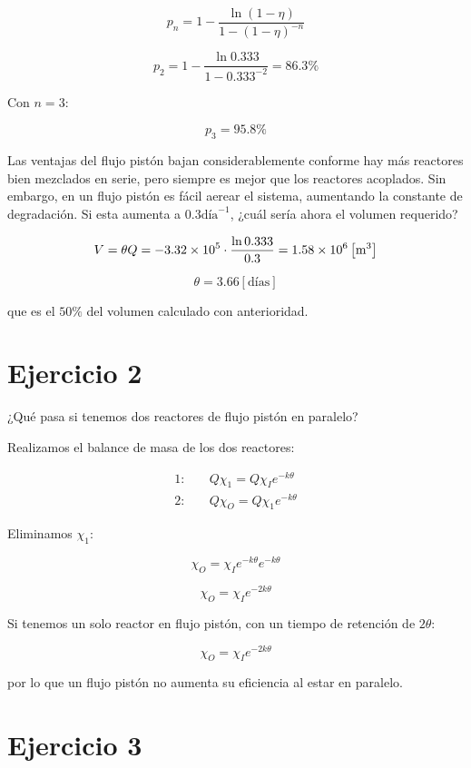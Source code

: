 \documentclass[11pt]{article}
\begin{document}
\[ \boxed{ p_n = 1 - \frac{ \ln \left( 1 - \eta \right) }{ 1 - \left( 1 - \eta \right)^{-n} } } \]

\[ p_2 = 1 - \frac{ \ln 0.333 }{ 1 - 0.333^{-2} } = 86.3 \% \]

Con \( n = 3 \):

\[ p_3 = 95.8 \% \]

Las ventajas del flujo pistón bajan considerablemente conforme hay más reactores bien mezclados en serie, pero siempre es mejor que los reactores acoplados. Sin embargo, en un flujo pistón es fácil aerear el sistema, aumentando la constante de degradación. Si esta aumenta a \( 0.3 \text{día}^{-1} \), ¿cuál sería ahora el volumen requerido?

\[ V = \theta Q = -3.32 \times 10^5 \cdot \frac{ \ln 0.333 }{ 0.3 } = 1.58 \times 10^6 \left[ \text m ^ 3 \right] \]

\[ \theta = 3.66 \left[ \text{días} \right] \]

que es el \( 50 \% \) del volumen calculado con anterioridad.

\section{Ejercicio 2}

¿Qué pasa si tenemos dos reactores de flujo pistón en paralelo?

\bigskip \bigskip

Realizamos el balance de masa de los dos reactores:

\[ \begin{aligned}
    1: \quad & Q \chi_1 = Q \chi_I e^{ -k \theta } \\
    2: \quad & Q \chi_O = Q \chi_1 e^{ -k \theta }
\end{aligned} \]

Eliminamos \( \chi_1 \):

\[ \chi_O = \chi_I e^{-k \theta} e^{-k \theta} \]

\[ \chi_O = \chi_I e^{-2k \theta} \]

Si tenemos un solo reactor en flujo pistón, con un tiempo de retención de \( 2 \theta \):

\[ \chi_O = \chi_I e^{-2k \theta} \]

por lo que un flujo pistón no aumenta su eficiencia al estar en paralelo.

\section{Ejercicio 3}
\end{document}

